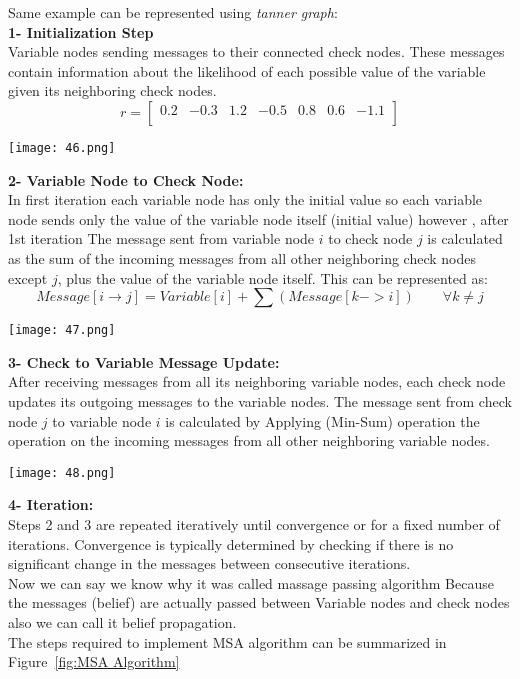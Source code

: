 Same example can be represented using \emph{tanner graph}:\\
\textbf{1- Initialization Step}\\
Variable nodes sending messages to their connected check nodes. These messages contain information about the likelihood of each possible value of the variable given its neighboring check nodes.
\[ r=[\begin{matrix}0.2&-0.3&1.2&-0.5&0.8&0.6&-1.1\\\end{matrix}] \]
\begin{figure*}[ht]
    \centering
    \texttt{[image: 46.png]}
\end{figure*}

\textbf{2- Variable Node to Check Node:}\\
In first iteration each variable node has only the initial value so each variable node sends only the value of the variable node itself (initial value) however , after 1st iteration The message sent from variable node $i$ to check node $j$ is calculated as the sum of the incoming messages from all other neighboring check nodes except $j$, plus the value of the variable node itself. This can be represented as:
\[Message[i \rightarrow j] = Variable[i] + \sum(Message[k -> i]) \qquad \forall k \neq j \]
\begin{figure*}[ht]
    \centering
    \texttt{[image: 47.png]}
\end{figure*}

\textbf{3- Check to Variable Message Update:}\\
After receiving messages from all its neighboring variable nodes, each check node updates its outgoing messages to the variable nodes. The message sent from check node $j$ to variable node $i$ is calculated by Applying (Min-Sum) operation the operation on the incoming messages from all other neighboring variable nodes.
\begin{figure*}[ht]
    \centering
    \texttt{[image: 48.png]}
\end{figure*}

\textbf{4- Iteration:}\\ 
Steps 2 and 3 are repeated iteratively until convergence or for a fixed number of iterations. Convergence is typically determined by checking if there is no significant change in the messages between consecutive iterations.\\
Now we can say we know why it was called massage passing algorithm Because the messages (belief) are actually passed between Variable nodes and check nodes also we can call it belief propagation.\\
The steps required to implement MSA algorithm can be summarized in Figure~\ref{fig:MSA Algorithm}

